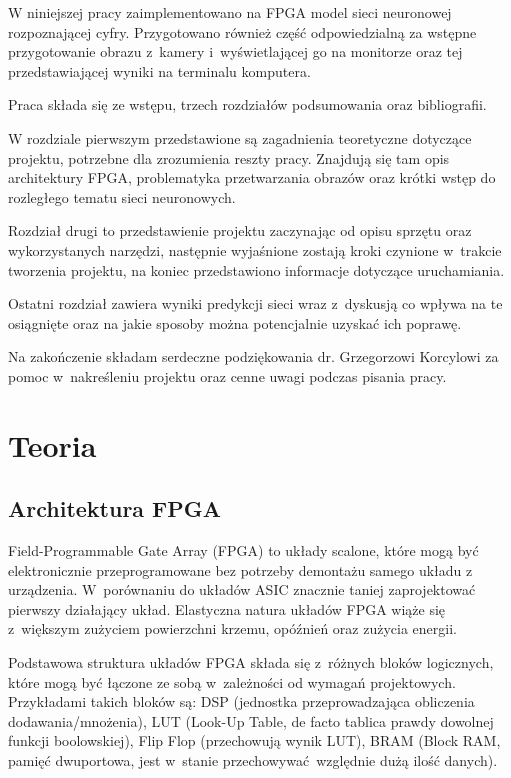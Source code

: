 \documentclass[12pt, oneside, a4paper]{article}
\begin{document}
W niniejszej pracy zaimplementowano na FPGA model sieci neuronowej rozpoznającej
cyfry. Przygotowano również część odpowiedzialną za wstępne przygotowanie
obrazu z~kamery i~wyświetlającej go na monitorze oraz tej przedstawiającej
wyniki na terminalu komputera.

Praca składa się ze wstępu, trzech rozdziałów podsumowania oraz bibliografii.

W rozdziale pierwszym przedstawione są zagadnienia teoretyczne dotyczące
projektu, potrzebne dla zrozumienia reszty pracy. Znajdują się tam opis
architektury FPGA, problematyka przetwarzania obrazów oraz krótki wstęp
do rozległego tematu sieci neuronowych.

Rozdział drugi to przedstawienie projektu zaczynając od opisu
sprzętu oraz wykorzystanych narzędzi, następnie wyjaśnione zostają kroki
czynione w~trakcie tworzenia projektu, na koniec przedstawiono informacje
dotyczące uruchamiania.

Ostatni rozdział zawiera wyniki predykcji sieci wraz z~dyskusją co wpływa
na te osiągnięte oraz na jakie sposoby można potencjalnie uzyskać ich poprawę.

Na zakończenie składam serdeczne podziękowania dr. Grzegorzowi Korcylowi
za pomoc w~nakreśleniu projektu oraz cenne uwagi podczas pisania pracy.
\restoregeometry{}

\newpage
\section{Teoria}\label{sec:Teoria}
\subsection{Architektura FPGA}\label{sec:Architektura FPGA}
Field-Programmable Gate Array (FPGA) to układy scalone, które mogą być
elektronicznie przeprogramowane bez potrzeby demontażu samego układu
z urządzenia. W~porównaniu do układów ASIC znacznie taniej zaprojektować
pierwszy działający układ. Elastyczna natura układów FPGA wiąże się z~większym
zużyciem powierzchni krzemu, opóźnień oraz zużycia energii.\cite{kuon08}

Podstawowa struktura układów FPGA składa się z~różnych bloków logicznych,
które mogą być łączone ze sobą w~zależności od wymagań projektowych.
Przykładami takich bloków są:
DSP (jednostka przeprowadzająca obliczenia dodawania/mnożenia),
LUT (Look-Up Table, de facto tablica prawdy dowolnej funkcji boolowskiej),
Flip Flop (przechowują wynik LUT), BRAM (Block RAM, pamięć dwuportowa,
jest w~stanie przechowywać względnie dużą ilość danych).
\end{document}
